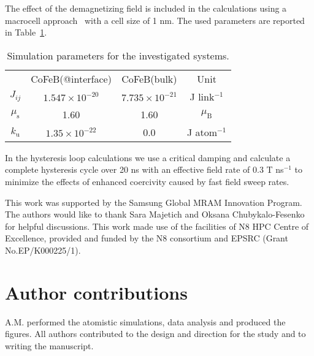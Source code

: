 \documentclass[aps,prb,signlecolumn,preprint,superscriptaddress,10]{revtex4-1}
\newcommand{\smmu}{\ensuremath{\mu_{\mathrm{s}}}\xspace}
\newcommand{\smJij}{\ensuremath{J_{ij}}\xspace}
\newcommand{\smKu}{\ensuremath{k_{\mathrm{u}}}\xspace}
\newcommand{\muB}{\ensuremath{\mu_{\mathrm{B}}}\xspace}
\begin{document}
The effect of the demagnetizing field is included in the calculations using a macrocell approach~\cite{vampire} with a cell size of 1 nm. 
The used parameters are reported in Table~\ref{table:atomstic_parameters}.
%
\begin{table}[!htb]
\caption{Simulation parameters for the investigated systems.}
\begin{ruledtabular}
\begin{tabular}{cccc}
  			&   CoFeB(@interface)     			& CoFeB(bulk) 			& Unit            \\
  \cline{1-4}
  \smJij    & $1.547 \times 10^{-20}$  	& $7.735\times 10^{-21}$& J link$^{-1}$\\ 
  \smmu     & 1.60		               	& 1.60 					& \muB\\
  \smKu     & $1.35\times 10^{-22}$		& 0.0					& J atom$^{-1}$ \\
\end{tabular}
\end{ruledtabular}
\label{table:atomstic_parameters}
\end{table}
%

In the hysteresis loop calculations we use a critical damping and calculate a complete hysteresis cycle over 20 ns with an effective field rate of 0.3 T ns$^{-1}$ to minimize the effects of enhanced coercivity caused by fast field sweep rates.
%


%
\begin{acknowledgments}
This work was supported by the Samsung Global MRAM Innovation Program. The authors would like to thank Sara Majetich and Oksana Chubykalo-Fesenko for helpful discussions. This work made use of the facilities of N8 HPC Centre of Excellence, provided and funded by the N8 consortium and EPSRC (Grant No.EP/K000225/1).
\end{acknowledgments}
\section*{Author contributions}
A.M. performed the atomistic simulations, data analysis and produced the figures. All authors contributed to the design and direction for the study and to writing the manuscript. 
\end{document}
